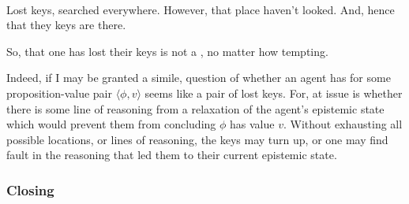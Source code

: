 \paragraph{}
\label{sec:ideaS:illus}

\begin{note}
  \begin{illustration}
    Lost keys, searched everywhere.
    However, \epVAd{} that place haven't looked.
    And, hence \epVAd{} that they keys are there.
  \end{illustration}
  So, that one has lost their keys is not a \sink{}, no matter how tempting.

  Indeed, if I may be granted a simile, question of whether an agent has \support{} for some proposition-value pair \(\langle \phi, v \rangle\) seems like a pair of lost keys.
  For, at issue is whether there is some line of reasoning from a relaxation of the agent's epistemic state which would prevent them from concluding \(\phi\) has value \(v\).
  Without exhausting all possible locations, or lines of reasoning, the keys may turn up, or one may find fault in the reasoning that led them to their current epistemic state.
\end{note}


\subsubsection{Closing \ideaS{}}
\label{sec:ideaS:closing}

